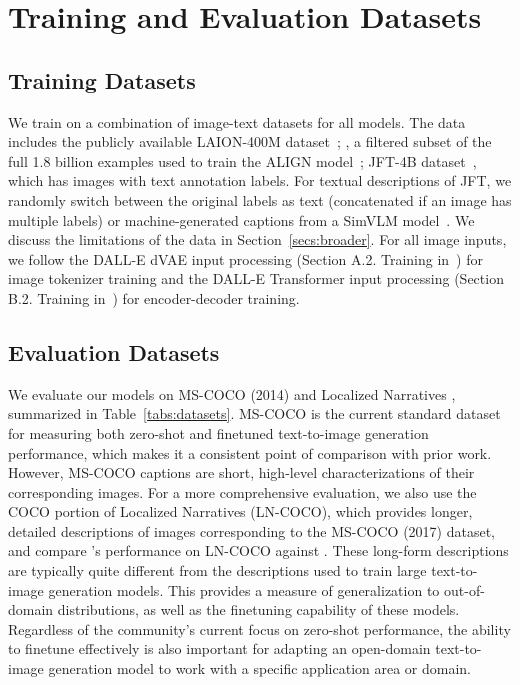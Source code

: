 \section{Training and Evaluation Datasets}
\subsection{Training Datasets}
\label{secs:data}

We train on a combination of image-text datasets for all \bdraw models. The data includes the publicly available LAION-400M dataset~\cite{schuhmann2021laion}; \webfit, a filtered subset of the full 1.8 billion examples used to train the ALIGN model~\cite{align-paper}; JFT-4B dataset~\cite{zhai2021scaling}, which has images with text annotation labels. For textual descriptions of JFT, we randomly switch between the original labels as text (concatenated if an image has multiple labels) or machine-generated captions from a SimVLM model~\cite{wang2021simvlm}. We discuss the limitations of the data in Section~\ref{secs:broader}. For all image inputs, we follow the DALL-E dVAE input processing (Section A.2. Training in~\cite{ramesh2021zero}) for image tokenizer training and the DALL-E Transformer input processing (Section B.2. Training in~\cite{ramesh2021zero}) for encoder-decoder training.

\subsection{Evaluation Datasets}

We evaluate our models on MS-COCO (2014) \cite{lin2014microsoft} and Localized Narratives \cite{PontTuset_eccv2020}, summarized in Table~\ref{tabs:datasets}. MS-COCO is the current standard dataset for measuring both zero-shot and finetuned text-to-image generation performance, which makes it a consistent point of comparison with prior work. However, MS-COCO captions are short, high-level characterizations of their corresponding images. For a more comprehensive evaluation, we also use the COCO portion of Localized Narratives (LN-COCO), which provides longer, detailed descriptions of images corresponding to the MS-COCO (2017) dataset, and compare \bdraw's performance on LN-COCO against \cite{trecs2020, zhang2021cross}. These long-form descriptions are typically quite different from the descriptions used to train large text-to-image generation models. This provides a measure of generalization to out-of-domain distributions, as well as the finetuning capability of these models. Regardless of the community's current focus on zero-shot performance, the ability to finetune effectively is also important for adapting an open-domain text-to-image generation model to work with a specific application area or domain.

